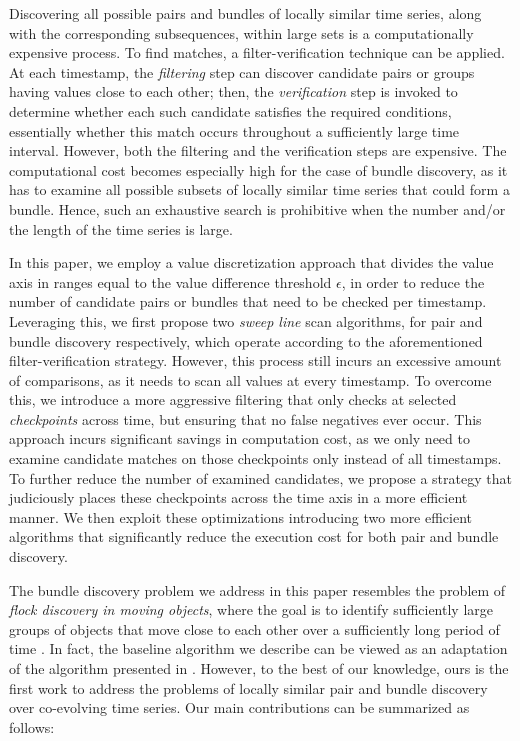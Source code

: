 Discovering all possible pairs and bundles of locally similar time series, along with the corresponding subsequences, within large sets is a computationally expensive process. To find matches, a filter-verification technique can be applied. At each timestamp, the {\em filtering} step can discover candidate pairs or groups having values close to each other; then, the {\em verification} step is invoked to determine whether each such candidate satisfies the required conditions, essentially whether this match occurs throughout a sufficiently large time interval. However, both the filtering and the verification steps are expensive. The computational cost becomes especially high for the case of bundle discovery, as it has to examine all possible subsets of locally similar time series that could form a bundle. Hence, such an exhaustive search is prohibitive when the number and/or the length of the time series is large.

In this paper, we employ a value discretization approach that divides the value axis in ranges equal to the value difference threshold $\epsilon$, in order to reduce the number of candidate pairs or bundles that need to be checked per timestamp. Leveraging this, we first propose two \textit{sweep line} scan algorithms, for pair and bundle discovery respectively, which operate according to the aforementioned filter-verification strategy. However, this process still incurs an excessive amount of comparisons, as it needs to scan all values at every timestamp. To overcome this, we introduce a more aggressive filtering  that only checks at selected \textit{checkpoints} across time, but ensuring that no false negatives ever occur. This approach incurs significant savings in computation cost, as we only need to examine candidate matches on those checkpoints only instead of all timestamps. To further reduce the number of examined candidates, we propose a strategy that judiciously places these checkpoints across the time axis in a more efficient manner. We then exploit these optimizations introducing two more efficient algorithms that significantly reduce the execution cost for both pair and bundle discovery.

The bundle discovery problem we address in this paper resembles the problem of \textit{flock discovery in moving objects}, where the goal is to identify sufficiently large groups of objects that move close to each other over a sufficiently long period of time \cite{gudmundsson2006computing, benkert2008reporting, vieira2009line, tanaka2015efficient}. In fact, the baseline algorithm we describe can be viewed as an adaptation of the algorithm presented  in \cite{vieira2009line}. However, to the best of our knowledge, ours is the first work to address the problems of locally similar pair and bundle discovery over co-evolving time series. Our main contributions can be summarized as follows:


